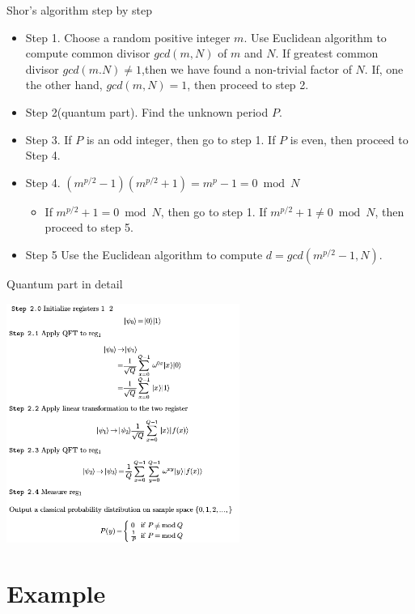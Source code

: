 \begin{frame}{Shor's algorithm step by step}

\begin{itemize}
\item
  Step 1. Choose a random positive integer $m$. Use Euclidean algorithm
  to compute common divisor $gcd(m,N)$ of $m$ and $N$. If greatest
  common divisor $gcd(m.N)\neq 1$,then we have found a non-trivial
  factor of $N$. If, one the other hand, $gcd(m,N) =1$, then proceed to
  step 2.
\item
  Step 2(quantum part). Find the unknown period $P$.
\item
  Step 3. If $P$ is an odd integer, then go to step 1. If $P$ is even,
  then proceed to Step 4.
\item
  Step 4. $(m^{p/2}-1)(m^{p/2}+1)=m^{p}-1=0 \bmod{N}$

  \begin{itemize}
  \itemsep1pt\parskip0pt
  \item
    If $m^{p/2}+1=0 \bmod{N}$, then go to step 1. If
    $m^{p/2}+1\neq 0 \bmod{N}$, then proceed to step 5.
  \end{itemize}
\item
  Step 5 Use the Euclidean algorithm to compute $d=gcd(m^{p/2}-1,N)$.
\end{itemize}

\end{frame}

\begin{frame}{Quantum part in detail}

\centerline{\includegraphics[width=3in]{gg.png}}

\end{frame}

\section{Example}\label{example}

